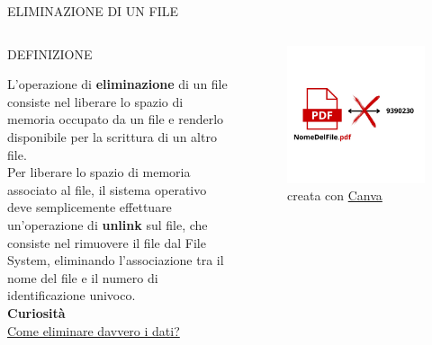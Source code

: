 \documentclass[aspectratio=1610]{beamer}
\begin{document}
\begin{frame}{ELIMINAZIONE DI UN FILE}
    \begin{columns}
            \begin{alertblock}{DEFINIZIONE}
                \begin{minipage}{0.97\linewidth}
                    \justifying
                    L'operazione di \textbf{eliminazione} di un file consiste nel liberare lo spazio di memoria occupato da un file 
                    e renderlo disponibile per la scrittura di un altro file.\\
                    Per liberare lo spazio di memoria associato al file, il sistema operativo deve semplicemente 
                    effettuare un'operazione di \textbf{unlink} sul file, che consiste nel rimuovere il file dal File System, 
                    eliminando l'associazione tra il nome del file e il numero di identificazione univoco.\\
                    \bigskip
                    \tiny{\textbf{Curiosità}}\\
                    \tiny{\href{https://www.garanteprivacy.it/web/guest/home/docweb/-/docweb-display/docweb/1574080}{Come eliminare davvero i dati?}}                                         
                \end{minipage}
            \end{alertblock}
            \begin{figure}
                \includegraphics[width=\linewidth]{img/eliminazione.jpg}
                \caption{{creata con \href{https://www.canva.com/}{Canva}}}
            \end{figure}
    \end{columns}
\end{frame}
\end{document}
